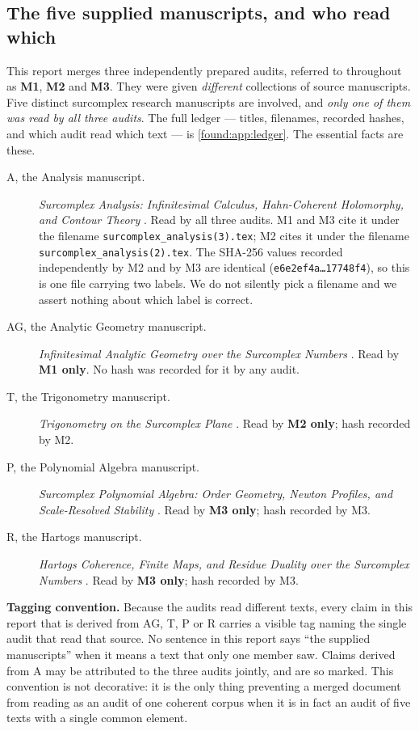 \documentclass[11pt,letterpaper]{article}
\numberwithin{equation}{section}
\theoremstyle{definition}
\theoremstyle{remark}
\begin{document}
\subsection{The five supplied manuscripts, and who read which}
\label{found:sub:ledger}
This report merges three independently prepared audits, referred to throughout
as \textbf{M1}, \textbf{M2} and \textbf{M3}. They were given \emph{different}
collections of source manuscripts. Five distinct surcomplex research
manuscripts are involved, and \emph{only one of them was read by all three
audits}. The full ledger --- titles, filenames, recorded hashes, and which
audit read which text --- is \cref{found:app:ledger}. The essential facts are
these.

\begin{description}
\item[A, the Analysis manuscript.] \emph{Surcomplex Analysis: Infinitesimal
Calculus, Hahn-Coherent Holomorphy, and Contour Theory}
\cite{found:SrcA}. Read by all three audits. M1 and M3 cite it under the
filename \texttt{surcomplex\_analysis(3).tex}; M2 cites it under the filename
\texttt{surcomplex\_analysis(2).tex}. The SHA-256 values recorded independently
by M2 and by M3 are identical
(\texttt{e6e2ef4a\ldots17748f4}), so this is one file carrying two labels. We
do not silently pick a filename and we assert nothing about which label is
correct.
\item[AG, the Analytic Geometry manuscript.] \emph{Infinitesimal Analytic
Geometry over the Surcomplex Numbers} \cite{found:SrcAG}. Read by \textbf{M1
only}. No hash was recorded for it by any audit.
\item[T, the Trigonometry manuscript.] \emph{Trigonometry on the Surcomplex
Plane} \cite{found:SrcTrig}. Read by \textbf{M2 only}; hash recorded by M2.
\item[P, the Polynomial Algebra manuscript.] \emph{Surcomplex Polynomial
Algebra: Order Geometry, Newton Profiles, and Scale-Resolved Stability}
\cite{found:SrcP}. Read by \textbf{M3 only}; hash recorded by M3.
\item[R, the Hartogs manuscript.] \emph{Hartogs Coherence, Finite Maps, and
Residue Duality over the Surcomplex Numbers} \cite{found:SrcR}. Read by
\textbf{M3 only}; hash recorded by M3.
\end{description}

\noindent\textbf{Tagging convention.} Because the audits read different texts,
every claim in this report that is derived from AG, T, P or R carries a visible
tag naming the single audit that read that source. No sentence in this report
says ``the supplied manuscripts'' when it means a text that only one member
saw. Claims derived from A may be attributed to the three audits jointly, and
are so marked. This convention is not decorative: it is the only thing
preventing a merged document from reading as an audit of one coherent corpus
when it is in fact an audit of five texts with a single common element.
\end{document}
